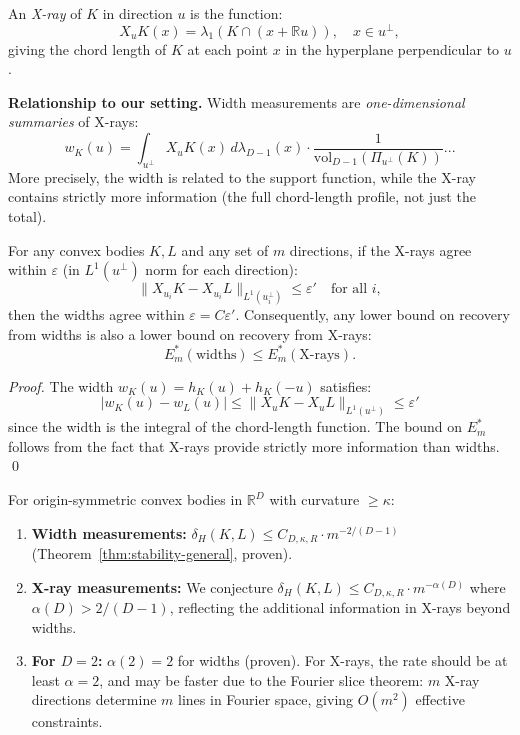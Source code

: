 An \emph{X-ray} of $K$ in direction $u$ is the function:
\[
  X_u K(x) = \lambda_1(K \cap (x + \mathbb{R}u)), \quad x \in u^\perp,
\]
giving the chord length of $K$ at each point $x$ in the hyperplane perpendicular to $u$.

\textbf{Relationship to our setting.} Width measurements are \emph{one-dimensional summaries} of X-rays:
\[
  w_K(u) = \int_{u^\perp} X_u K(x)\, d\lambda_{D-1}(x) \cdot \frac{1}{\text{vol}_{D-1}(\Pi_{u^\perp}(K))}... 
\]
More precisely, the width is related to the support function, while the X-ray contains strictly more information (the full chord-length profile, not just the total).

\begin{proposition}
\label{prop:xray-lb}
For any convex bodies $K, L$ and any set of $m$ directions, if the X-rays agree within $\varepsilon$ (in $L^1(u^\perp)$ norm for each direction):
\[
  \|X_{u_i} K - X_{u_i} L\|_{L^1(u_i^\perp)} \leq \varepsilon' \quad \text{for all } i,
\]
then the widths agree within $\varepsilon = C \varepsilon'$. Consequently, any lower bound on recovery from widths is also a lower bound on recovery from X-rays:
\[
  E_m^*(\text{widths}) \leq E_m^*(\text{X-rays}).
\]
\end{proposition}

\begin{proof}
The width $w_K(u) = h_K(u) + h_K(-u)$ satisfies:
\[
  |w_K(u) - w_L(u)| \leq \|X_u K - X_u L\|_{L^1(u^\perp)} \leq \varepsilon'
\]
since the width is the integral of the chord-length function. The bound on $E_m^*$ follows from the fact that X-rays provide strictly more information than widths. \qed
\end{proof}

\begin{conjecture}
\label{conj:problem15}
For origin-symmetric convex bodies in $\mathbb{R}^D$ with curvature $\geq \kappa$:

\begin{enumerate}[label=(\alph*)]
  \item \textbf{Width measurements:} $\delta_H(K, L) \leq C_{D,\kappa,R} \cdot m^{-2/(D-1)}$ (Theorem~\ref{thm:stability-general}, proven).
  
  \item \textbf{X-ray measurements:} We conjecture $\delta_H(K, L) \leq C_{D,\kappa,R} \cdot m^{-\alpha(D)}$ where $\alpha(D) > 2/(D-1)$, reflecting the additional information in X-rays beyond widths.
  
  \item \textbf{For $D = 2$:} $\alpha(2) = 2$ for widths (proven). For X-rays, the rate should be at least $\alpha = 2$, and may be faster due to the Fourier slice theorem: $m$ X-ray directions determine $m$ lines in Fourier space, giving $O(m^2)$ effective constraints.
\end{enumerate}
\end{conjecture}

